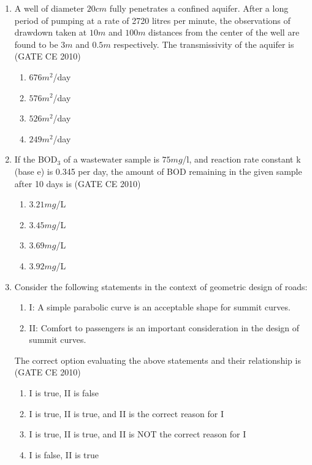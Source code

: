 \documentclass[journal]{IEEEtran}
\begin{document}
\begin{enumerate}
    \item A well of diameter $20 cm$ fully penetrates a confined aquifer. After a long period of pumping at a rate of 2720 litres per minute, the observations of drawdown taken at  
    $10m$ and $100 m$ distances from the center of the well are found to be $3 m$ and $0.5 m$ respectively. The transmissivity of the aquifer  
    is \hfill (GATE CE 2010)
    \begin{multicols}{4}
        \begin{enumerate}
            \item $676 m^2$/day
            \item $576 m^2$/day
            \item $526 m^2$/day
            \item $249 m^2$/day
        \end{enumerate}
    \end{multicols}

    \item If the BOD$_3$ of a wastewater sample is $75 mg$/l, and reaction rate constant k (base e) is 0.345 per day, the amount of BOD remaining in the given sample after 10 days is   \hfill (GATE CE 2010)

    \begin{multicols}{4}
        \begin{enumerate}
            \item $3.21 mg$/L
            \item $3.45 mg$/L
            \item $3.69 mg$/L
            \item $3.92 mg$/L
        \end{enumerate}
    \end{multicols}

    \item Consider the following statements in the context of geometric design of roads:
    \begin{enumerate}
        \item[] I: A simple parabolic curve is an acceptable shape for summit curves.
        \item[] II: Comfort to passengers is an important consideration in the design of summit curves.
    \end{enumerate}
    The correct option evaluating the above statements and their relationship is   \hfill (GATE CE 2010)

    \begin{enumerate}
        \item I is true, II is false
        \item I is true, II is true, and II is the correct reason for I
        \item I is true, II is true, and II is NOT the correct reason for I
        \item I is false, II is true
    \end{enumerate}


\end{enumerate}
\end{document}
